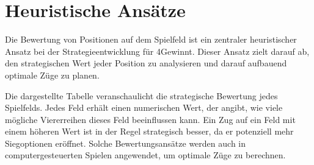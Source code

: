 \section{Heuristische Ansätze}

Die Bewertung von Positionen auf dem Spielfeld ist ein zentraler heuristischer Ansatz bei der Strategieentwicklung für 4Gewinnt. Dieser Ansatz zielt darauf ab, den strategischen Wert jeder Position zu analysieren und darauf aufbauend optimale Züge zu planen.

Die dargestellte Tabelle veranschaulicht die strategische Bewertung jedes Spielfelds. Jedes Feld erhält einen numerischen Wert, der angibt, wie viele mögliche Viererreihen dieses Feld beeinflussen kann. Ein Zug auf ein Feld mit einem höheren Wert ist in der Regel strategisch besser, da er potenziell mehr Siegoptionen eröffnet. Solche Bewertungsansätze werden auch in computergesteuerten Spielen angewendet, um optimale Züge zu berechnen\autocites{monien_alphabeta-algorithmus_2008}.

